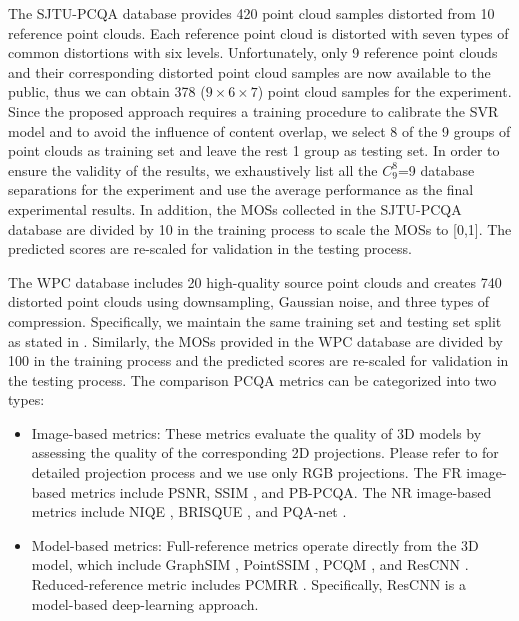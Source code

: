\documentclass[lettersize,journal]{IEEEtran}
\begin{document}
 The SJTU-PCQA database provides 420 point cloud samples distorted from 10 reference point clouds. Each reference point cloud is distorted with seven types of common distortions with six levels. Unfortunately, only 9 reference point clouds and their corresponding distorted point cloud samples are now available to the public, thus we can obtain 378 ($9\times6\times7$) point cloud samples for the experiment.
Since the proposed approach requires a training procedure to calibrate the SVR model and to avoid the influence of content overlap, we select 8 of the 9 groups of point clouds as training set and leave the rest 1 group as testing set. In order to ensure the validity of the results, we exhaustively list all the $C_{9}^8$=9 database separations for the experiment and use the average performance as the final experimental results. In addition, the MOSs collected in the SJTU-PCQA database are divided by 10 in the training process to scale the MOSs to [0,1]. The predicted scores are re-scaled for validation in the testing process. 

{The WPC database includes 20 high-quality source point clouds and creates 740 distorted point clouds using downsampling, Gaussian noise, and three types of compression. Specifically, we maintain the same training set and testing set split as stated in \cite{liu2021pqa}. Similarly, the MOSs provided in the WPC database are divided by 100 in the training process and the predicted scores are re-scaled for validation in the testing process.
The comparison PCQA metrics can be categorized into two types:}





\begin{itemize}
    \item  Image-based metrics: These metrics evaluate the quality of 3D models by assessing the quality of the corresponding 2D projections. Please refer to \cite{sjtu-pcqa} for detailed projection process and we use only RGB projections. The FR image-based metrics include PSNR, SSIM \cite{ssim}, and PB-PCQA\cite{sjtu-pcqa}. The NR image-based metrics include NIQE \cite{niqe}, BRISQUE \cite{brisque}, and PQA-net \cite{liu2021pqa}.

    \item Model-based metrics: Full-reference metrics operate directly from the 3D model, which include GraphSIM \cite{yang2020inferring}, PointSSIM \cite{pcqa3}, PCQM \cite{pcqm}, and ResCNN \cite{pcqa-large-scale}. Reduced-reference metric includes PCMRR \cite{viola2020reduced}. Specifically, ResCNN is a model-based deep-learning approach. 
\end{itemize}
\end{document}

